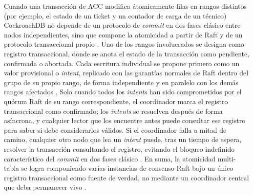 \documentclass[11pt,a4paper]{article}
\begin{document}
Cuando una transacción de ACC modifica átomicamente filas en rangos
distintos (por ejemplo, el estado de un ticket y un contador de carga de
un técnico) CockroachDB no depende de un protocolo de \emph{commit} en
dos fases clásico entre nodos independientes, sino que compone la
atomicidad a partir de Raft y de un protocolo transaccional propio
\cite{taft2020}. Uno de los rangos involucrados se designa como registro
transaccional, donde se anota el estado de la transacción como pendiente,
confirmada o abortada. Cada escritura individual se propone primero como un
valor provisional o \emph{intent}, replicado con las garantías normales de
Raft dentro del grupo de su propio rango, de forma independiente y en
paralelo con los demás rangos afectados \cite{taft2020,ongaro2014}. Solo
cuando todos los \emph{intents} han sido comprometidos por el quórum Raft de
su rango correspondiente, el coordinador marca el registro transaccional
como confirmado; los \emph{intents} se resuelven después de forma
asíncrona, y cualquier lector que los encuentre antes puede consultar ese
registro para saber si debe considerarlos válidos. Si el coordinador falla a
mitad de camino, cualquier otro nodo que lea un \emph{intent} puede, tras un
tiempo de espera, resolver la transacción consultando el registro, evitando
el bloqueo indefinido característico del \emph{commit} en dos fases clásico
\cite{skeen1981}. En suma, la atomicidad multi-tabla se logra componiendo
varias instancias de consenso Raft bajo un único registro transaccional como
fuente de verdad, no mediante un coordinador central que deba permanecer
vivo \cite{taft2020}.
\end{document}
